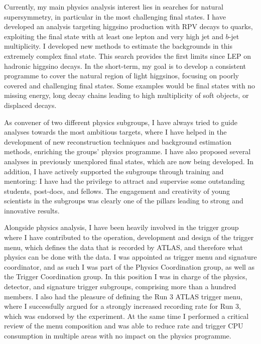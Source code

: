 \documentclass[11pt,a4paper,sans]{moderncv}        %
\begin{document}
Currently, my main physics analysis interest lies in searches for natural supersymmetry, in particular in the most challenging final states. 
I have developed an analysis targeting higgsino production with RPV decays to quarks, exploiting the final state with at least one lepton and very high jet and $b$-jet multiplicity. I developed new methods to estimate the backgrounds in this extremely complex final state. This search provides the first limits since LEP on hadronic higgsino decays.
In the short-term, my goal is to develop a consistent programme to cover the natural region of light higgsinos, focusing on poorly covered and challenging final states. Some examples would be final states with no missing energy, long decay chains leading to high multiplicity of soft objects, or displaced decays. 
\newline

As convener of two different physics subgroups, I have always tried to guide analyses towards the most ambitious targets, where I have helped in the development of new reconstruction techniques and background estimation methods, enriching the groups' physics programme.
I have also proposed several analyses in previously unexplored final states, which are now being developed. In addition, I have actively supported the subgroups through training and mentoring: I have had the privilege to attract and supervise some outstanding students, post-docs, and fellows. The engagement and creativity of young scientists in the subgroups was clearly one of the pillars leading to strong and innovative results.
\newline


Alongside physics analysis, I have been heavily involved in the trigger group where I have contributed to the operation, development and design of the trigger menu, which defines the data that is recorded by ATLAS, and therefore what physics can be done with the data. I was appointed as trigger menu and signature coordinator, and as such I was part of the Physics Coordination group, as well as the Trigger Coordination group. In this position I was in charge of the physics, detector, and signature trigger subgroups, comprising more than a hundred members.
I also had the pleasure of defining the Run 3 ATLAS trigger menu, where I successfully argued for a strongly increased recording rate for Run 3, which was endorsed by the experiment. At the same time I performed a critical review of the menu composition and was able to reduce rate and trigger CPU consumption in multiple areas with no impact on the physics programme.
\newline
\end{document}
